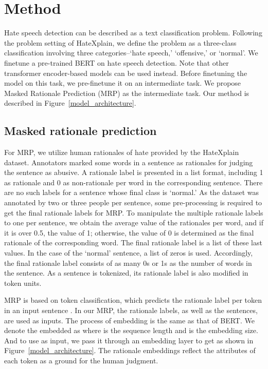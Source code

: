 \documentclass[11pt]{article}
\begin{document}
\section{Method}
Hate speech detection can be described as a text classification problem. Following the problem setting of HateXplain, we define the problem as a three-class classification involving three categories--`hate speech,' `offensive,' or `normal'. We finetune a pre-trained BERT on hate speech detection. Note that other transformer encoder-based models can be used instead. Before finetuning the model on this task, we pre-finetune it on an intermediate task. We propose Masked Rationale Prediction (MRP) as the intermediate task. Our method is described in Figure~\ref{model_architecture}.

\subsection{Masked rationale prediction}
For MRP, we utilize human rationales of hate provided by the HateXplain dataset. Annotators marked some words in a sentence as rationales for judging the sentence as abusive. A rationale label is presented in a list format, including 1 as rationale and 0 as non-rationale per word in the corresponding sentence. There are no such labels for a sentence whose final class is `normal.' As the dataset was annotated by two or three people per sentence, some pre-processing is required to get the final rationale labels for MRP. To manipulate the multiple rationale labels to one per sentence, we obtain the average value of the rationales per word, and if it is over 0.5, the value of 1; otherwise, the value of 0 is determined as the final rationale of the corresponding word. The final rationale label is a list of these last values.
In the case of the `normal' sentence, a list of zeros is used. Accordingly, the final rationale label consists of as many 0s or 1s as the number of words in the sentence. As a sentence is tokenized, its rationale label is also modified in token units.

MRP is based on token classification, which predicts the rationale label  per token in an input sentence . In our MRP, the rationale labels, as well as the sentences, are used as inputs. The process of embedding   is the same as that of BERT. We denote the embedded  as  where  is the sequence length and  is the embedding size. And to use  as input, we pass it through an embedding layer to get  as shown in Figure~\ref{model_architecture}.
The rationale embeddings reflect the attributes of each token as a ground for the human judgment.
\end{document}
